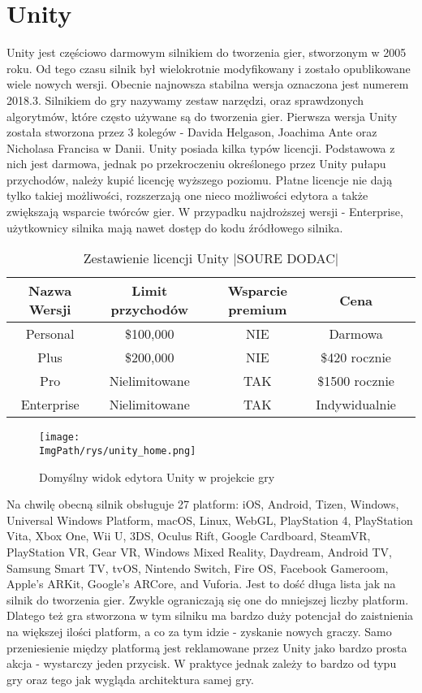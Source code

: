 \documentclass[a4paper,12pt,twoside,openany]{report}
\newcommand{\ImgPath}{.}
\begin{document}
\section{Unity}
Unity jest częściowo darmowym silnikiem do tworzenia gier, stworzonym w 2005 roku. Od tego czasu silnik był wielokrotnie modyfikowany i zostało opublikowane wiele nowych wersji. Obecnie najnowsza stabilna wersja oznaczona jest numerem 2018.3\cite{unity_wiki}. Silnikiem do gry nazywamy zestaw narzędzi, oraz sprawdzonych algorytmów, które często używane są do tworzenia gier. Pierwsza wersja Unity została stworzona przez 3 kolegów - Davida Helgason, Joachima Ante oraz Nicholasa Francisa w Danii. Unity posiada kilka typów licencji. Podstawowa z nich jest darmowa, jednak po przekroczeniu określonego przez Unity pułapu przychodów, należy kupić licencję wyższego poziomu. Płatne licencje nie dają tylko takiej możliwości, rozszerzają one nieco możliwości edytora a także zwiększają wsparcie twórców gier. W przypadku najdroższej wersji - Enterprise, użytkownicy silnika mają nawet dostęp do kodu źródłowego silnika.

\begin{table}[h!]
\centering
\begin{tabular}{c|cccc}
Nazwa Wersji & Limit przychodów & Wsparcie premium & Cena \\ \hline
Personal & \$100,000 & NIE & Darmowa \\
Plus & \$200,000 & NIE & \$420 rocznie \\
Pro & Nielimitowane & TAK & \$1500 rocznie \\
Enterprise & Nielimitowane & TAK & Indywidualnie \\
\end{tabular}
\caption{Zestawienie licencji Unity |SOURE DODAC|}
\label{table_unity_versions}
\end{table}

\begin{figure}[!htbp]
	\begin{center}
\centering
\texttt{[image: \\ImgPath/rys/unity\_home.png]}
\end{center}
	\caption{Domyślny widok edytora Unity w projekcie gry}
	\label{unity_home}
\end{figure}

Na chwilę obecną silnik obsługuje 27 platform: iOS, Android, Tizen, Windows, Universal Windows Platform, macOS, Linux, WebGL, PlayStation 4, PlayStation Vita, Xbox One, Wii U, 3DS, Oculus Rift, Google Cardboard, SteamVR, PlayStation VR, Gear VR, Windows Mixed Reality, Daydream, Android TV, Samsung Smart TV, tvOS, Nintendo Switch, Fire OS, Facebook Gameroom, Apple's ARKit, Google's ARCore, and Vuforia. Jest to dość długa lista jak na silnik do tworzenia gier. Zwykle ograniczają się one do mniejszej liczby platform. Dlatego też gra stworzona w tym silniku ma bardzo duży potencjał do zaistnienia na większej ilości platform, a co za tym idzie - zyskanie nowych graczy. Samo przeniesienie między platformą jest reklamowane przez Unity jako bardzo prosta akcja - wystarczy jeden przycisk. W praktyce jednak zależy to bardzo od typu gry oraz tego jak wygląda architektura samej gry.
\end{document}
